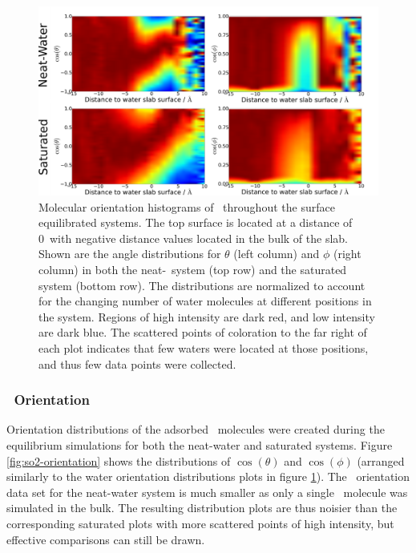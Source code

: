 \begin{figure}[h!]
	\begin{center}
		\includegraphics[scale=1.0]{images/h2o-angles/h2oangles.png}
		\caption{Molecular orientation histograms of \wat~throughout the surface equilibrated systems. The top surface is located at a distance of 0\angs~with negative distance values located in the bulk of the slab. Shown are the angle distributions for $\theta$ (left column) and $\phi$ (right column) in both the neat-\wat~system (top row) and the saturated system (bottom row). The distributions are normalized to account for the changing number of water molecules at different positions in the system. Regions of high intensity are dark red, and low intensity are dark blue. The scattered points of coloration to the far right of each plot indicates that few waters were located at those positions, and thus few data points were collected.}
		\label{fig:water-orientation}
	\end{center}
\end{figure}


\subsubsection{\suldiox~Orientation}

Orientation distributions of the adsorbed \suldiox~molecules were created during the equilibrium simulations for both the neat-water and saturated systems. Figure \ref{fig:so2-orientation} shows the distributions of $\cos(\theta)$ and $\cos(\phi)$ (arranged similarly to the water orientation distributions plots in figure \ref{fig:water-orientation}). The \suldiox~orientation data set for the neat-water system is much smaller as only a single \suldiox~molecule was simulated in the bulk. The resulting distribution plots are thus noisier than the corresponding saturated plots with more scattered points of high intensity, but effective comparisons can still be drawn.

